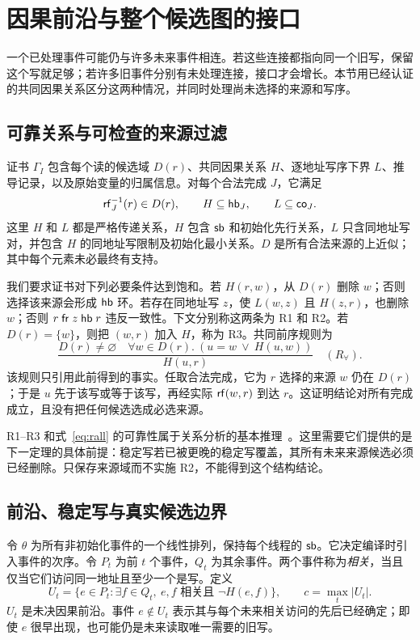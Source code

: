 \section{因果前沿与整个候选图的接口}\label{sec:frontier}
一个已处理事件可能仍与许多未来事件相连。若这些连接都指向同一个旧写，保留这个写就足够；若许多旧事件分别有未处理连接，接口才会增长。本节用已经认证的共同因果关系区分这两种情况，并同时处理尚未选择的来源和写序。

\subsection{可靠关系与可检查的来源过滤}
证书 $\Gamma_I$ 包含每个读的候选域 $D(r)$、共同因果关系 $H$、逐地址写序下界 $L$、推导记录，以及原始变量的归属信息。对每个合法完成 $J$，它满足
\begin{equation}\label{eq:reliable}
 \mathsf{rf}_J^{-1}(r)\in D(r),\qquad H\subseteq\mathsf{hb}_J,\qquad L\subseteq\mathsf{co}_J.
\end{equation}
这里 $H$ 和 $L$ 都是严格传递关系，$H$ 包含 $\mathsf{sb}$ 和初始化先行关系，$L$ 只含同地址写对，并包含 $H$ 的同地址写限制及初始化最小关系。$D$ 是所有合法来源的上近似；其中每个元素未必最终有支持。

我们要求证书对下列必要条件达到饱和。若 $H(r,w)$，从 $D(r)$ 删除 $w$；否则选择该来源会形成 $\mathsf{hb}$ 环。若存在同地址写 $z$，使 $L(w,z)$ 且 $H(z,r)$，也删除 $w$；否则 $r\mathrel{\mathsf{fr}}z\mathrel{\mathsf{hb}}r$ 违反一致性。下文分别称这两条为 R1 和 R2。若 $D(r)=\{w\}$，则把 $(w,r)$ 加入 $H$，称为 R3。共同前序规则为
\begin{equation}\label{eq:rall}
 \frac{D(r)\ne\varnothing\quad
       \forall w\in D(r).\ (u=w\ \lor\ H(u,w))}{H(u,r)}\quad(R_{\forall}).
\end{equation}
该规则只引用此前得到的事实。任取合法完成，它为 $r$ 选择的来源 $w$ 仍在 $D(r)$；于是 $u$ 先于该写或等于该写，再经实际 $\mathsf{rf}(w,r)$ 到达 $r$。这证明结论对所有完成成立，且没有把任何候选选成必选来源。

R1--R3 和式~\eqref{eq:rall} 的可靠性属于关系分析的基本推理~\cite{haas2023}。这里需要它们提供的是下一定理的具体前提：稳定写若已被更晚的稳定写覆盖，其所有未来来源候选必须已经删除。只保存来源域而不实施 R2，不能得到这个结构结论。

\subsection{前沿、稳定写与真实候选边界}
令 $\theta$ 为所有非初始化事件的一个线性排列，保持每个线程的 $\mathsf{sb}$。它决定编译时引入事件的次序。令 $P_t$ 为前 $t$ 个事件，$Q_t$ 为其余事件。两个事件称为\emph{相关}，当且仅当它们访问同一地址且至少一个是写。定义
\begin{equation}\label{eq:frontier}
 U_t=\{e\in P_t:\exists f\in Q_t,\ e,f\text{ 相关且 }\neg H(e,f)\},
 \qquad c=\max_t |U_t|.
\end{equation}
$U_t$ 是未决因果前沿。事件 $e\notin U_t$ 表示其与每个未来相关访问的先后已经确定；即使 $e$ 很早出现，也可能仍是未来读取唯一需要的旧写。

